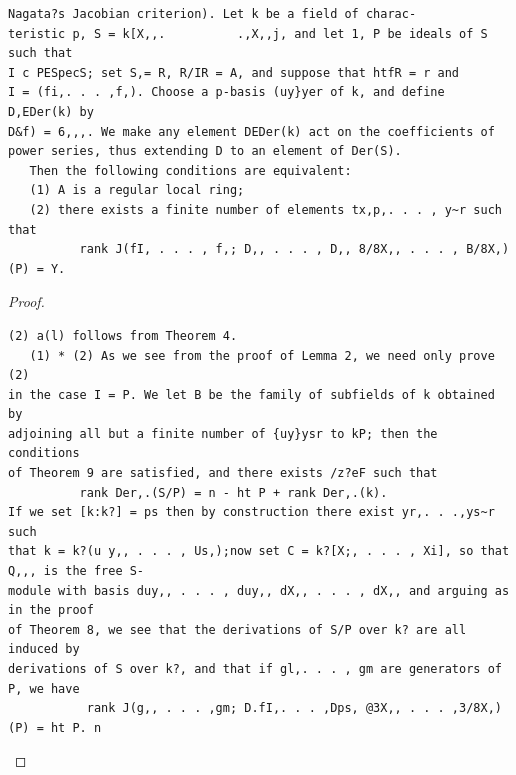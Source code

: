 \begin{theorem}\label{mcrt-auto-theorem-30-10}\uses{}
\begin{verbatim}
Nagata?s Jacobian criterion). Let k be a field of charac-
teristic p, S = k[X,,.          .,X,,j, and let 1, P be ideals of S such that
I c PESpecS; set S,= R, R/IR = A, and suppose that htfR = r and
I = (fi,. . . ,f,). Choose a p-basis (uy}yer of k, and define D,EDer(k) by
D&f) = 6,,,. We make any element DEDer(k) act on the coefficients of
power series, thus extending D to an element of Der(S).
   Then the following conditions are equivalent:
   (1) A is a regular local ring;
   (2) there exists a finite number of elements tx,p,. . . , y~r such that
          rank J(fI, . . . , f,; D,, . . . , D,, 8/8X,, . . . , B/8X,)(P) = Y.
\end{verbatim}
\end{theorem}
\begin{proof}
\begin{verbatim}
(2) a(l) follows from Theorem 4.
   (1) * (2) As we see from the proof of Lemma 2, we need only prove (2)
in the case I = P. We let B be the family of subfields of k obtained by
adjoining all but a finite number of {uy}ysr to kP; then the conditions
of Theorem 9 are satisfied, and there exists /z?eF such that
          rank Der,.(S/P) = n - ht P + rank Der,.(k).
If we set [k:k?] = ps then by construction there exist yr,. . .,ys~r such
that k = k?(u y,, . . . , Us,);now set C = k?[X;, . . . , Xi], so that Q,,, is the free S-
module with basis duy,, . . . , duy,, dX,, . . . , dX,, and arguing as in the proof
of Theorem 8, we see that the derivations of S/P over k? are all induced by
derivations of S over k?, and that if gl,. . . , gm are generators of P, we have
           rank J(g,, . . . ,gm; D.fI,. . . ,Dps, @3X,, . . . ,3/8X,)(P) = ht P. n
\end{verbatim}
\end{proof}


